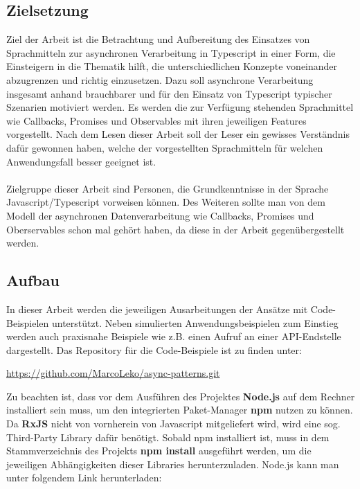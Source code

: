 \subsection{Zielsetzung}

Ziel der Arbeit ist die Betrachtung und Aufbereitung des Einsatzes von Sprachmitteln zur asynchronen Verarbeitung in Typescript in einer Form, die Einsteigern in die Thematik hilft, die unterschiedlichen Konzepte voneinander abzugrenzen und richtig einzusetzen. Dazu soll asynchrone Verarbeitung insgesamt anhand brauchbarer und für den Einsatz von Typescript typischer Szenarien motiviert werden. Es werden die zur Verfügung stehenden Sprachmittel wie Callbacks, Promises und Observables mit ihren jeweiligen Features vorgestellt. Nach dem Lesen dieser Arbeit soll der Leser ein gewisses Verständnis dafür gewonnen haben, welche der vorgestellten Sprachmitteln für welchen Anwendungsfall besser geeignet ist.\\\\

\noindent
Zielgruppe dieser Arbeit sind Personen, die Grundkenntnisse in der Sprache Javascript/Typescript vorweisen können. Des Weiteren sollte man von dem Modell der asynchronen Datenverarbeitung wie Callbacks, Promises und Oberservables schon mal gehört haben, da diese in der Arbeit gegenübergestellt werden.

\subsection{Aufbau}

In dieser Arbeit werden die jeweiligen Ausarbeitungen der Ansätze mit Code-Beispielen unterstützt. Neben simulierten Anwendungsbeispielen zum Einstieg werden auch praxisnahe Beispiele wie z.B. einen Aufruf an einer API-Endstelle dargestellt. Das Repository für die Code-Beispiele ist zu finden unter: 

\begin{center}
\url{https://github.com/MarcoLeko/async-patterns.git}
\end{center}

\noindent
Zu beachten ist, dass vor dem Ausführen des Projektes \textbf{Node.js} auf dem Rechner installiert sein muss, um den integrierten Paket-Manager \textbf{npm} nutzen zu können. Da \textbf{RxJS} nicht von vornherein von Javascript mitgeliefert wird, wird eine sog. \glqq Third-Party Library\grqq{} dafür benötigt. Sobald npm installiert ist, muss in dem Stammverzeichnis des Projekts \textbf{npm install} ausgeführt werden, um die jeweiligen Abhängigkeiten dieser Libraries herunterzuladen. Node.js kann man unter folgendem Link herunterladen:

